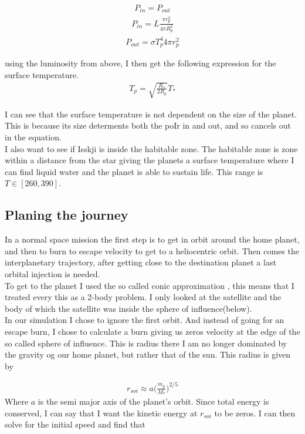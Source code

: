 \documentclass[a4paper, 10pt]{article}
\begin{document}
\begin{align}
P_{in} = P_{out}
\end{align}
\begin{align}
 P_{in} = L \frac{\pi r_p^2}{4\pi R_p^2}
\end{align}
\begin{align}
 P_{out} = \sigma T_p^4 4\pi r_p^2
\end{align}

using the luminosity from above, I then get the following expression for the surface temperature.
\begin{align}\label{eq:temp}
 T_p = \sqrt{\frac{R_*}{2R_p}}T_*
\end{align}

I can see that the surface temperature is not dependent on the size of the planet. This is because its size  determents both the poIr in and out, and so cancels out in the equation.\\

I also want to see if Isskji is inside the habitable zone. The habitable zone is zone within a distance from the star giving the planets a surface temperature where I can find liquid water and the planet is able to sustain life. This range is $T \in [260 , 390]$.

\subsection{Planing the journey}
In a normal space mission the first step is to get in orbit around the home planet, and then to burn to escape velocity to get to a heliocentric orbit. Then comes the interplanetary trajectory, after getting close to the destination planet a last orbital injection is needed.\\

To get to the planet I used the so called conic approximation \cite{SpaceDynamics}, this means that I treated every this as a 2-body problem. I only looked at the satellite and the body of which the satellite was inside the sphere of influence(below). \\

In our simulation I chose to ignore the first orbit. And instead of going for an escape burn, I chose to calculate a burn giving us zeros velocity at the edge of the so called sphere of influence. This is radius there I am no longer dominated by the gravity og our home planet, but rather that of the sun. This radius is given by\cite{sphere}

\begin{align}
r_{soi} \approx a \big( \frac{m_p}{M_*} \big) ^{2/5}
\end{align}
Where $a$ is the semi major axis of the planet's orbit. Since total energy is conserved, I can say that I want the kinetic energy at $r_{soi}$ to be zeros. I can then solve for the initial speed and find that 
\end{document}
